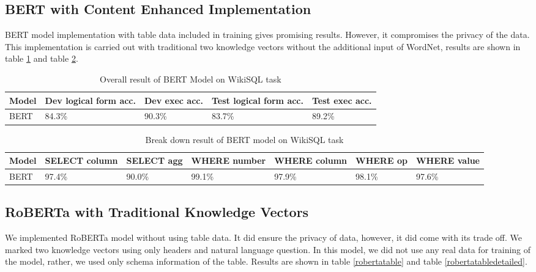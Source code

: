 \documentclass[12pt]{article}
\begin{document}
\subsection{BERT with Content Enhanced Implementation}

BERT model implementation with table data included in training gives promising results. However, it compromises the privacy of the data. This implementation is carried out with traditional two knowledge vectors without the additional input of WordNet, results are shown in table \ref{berttable} and table \ref{berttabledetailed}.


 \begin{table}
\centering
 \begin{tabular}{| m{2cm} | m{2cm}| m{2cm} |m{2cm}| m{2cm} |} 
 \hline
Model & Dev logical form acc. & Dev exec acc. & Test logical form acc. & Test exec acc. \\ 
 \hline\hline
  BERT & 84.3\% & 90.3\% & 83.7\% & 89.2\% \\ 
 \hline
\end{tabular}
\caption{Overall result of BERT Model on WikiSQL task}
\label{berttable}
\end{table}

\begin{table}
\centering
 \begin{tabular}{| m{2cm} | m{2cm}| m{2cm} |m{2cm}| m{2cm} |m{2cm} | m{2cm} |} 
 \hline
 Model  & SELECT column & SELECT agg & WHERE number & WHERE column & WHERE op & WHERE value\\ 
 \hline\hline
 BERT & 97.4\% & 90.0\% & 99.1\% & 97.9\% & 98.1\% &  97.6\% \\ 
 \hline

\end{tabular}
\caption{Break down result of BERT model on WikiSQL task}
\label{berttabledetailed}
\end{table}


\subsection{RoBERTa with Traditional Knowledge Vectors}

We implemented RoBERTa model without using table data. It did ensure the privacy of data, however, it did come with its trade off. We marked two knowledge vectors using only headers and natural language question. In this model, we did not use any real data for training of the model, rather, we used only schema information of the table. Results are shown in table \ref{robertatable} and table \ref{robertatabledetailed}.
\end{document}
